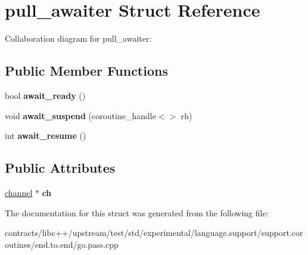 \hypertarget{structpull__awaiter}{}\section{pull\+\_\+awaiter Struct Reference}
\label{structpull__awaiter}


Collaboration diagram for pull\+\_\+awaiter\+:
\subsection*{Public Member Functions}
\begin{DoxyCompactItemize}
\item 
\mbox{\label{structpull__awaiter_aa73c9e70d6ba80627bf626d3929cedc0}} 
bool {\bfseries await\+\_\+ready} ()
\item 
\mbox{\label{structpull__awaiter_ab6231749220f85fc957e53d109980dd3}} 
void {\bfseries await\+\_\+suspend} (coroutine\+\_\+handle$<$$>$ rh)
\item 
\mbox{\label{structpull__awaiter_ab16abc8ffb1d202f09ddc0ecee459ae1}} 
int {\bfseries await\+\_\+resume} ()
\end{DoxyCompactItemize}
\subsection*{Public Attributes}
\begin{DoxyCompactItemize}
\item 
\mbox{\label{structpull__awaiter_a7c0c696ce6653ddc42bb9fb76ed9df8b}} 
\mbox{\hyperlink{classchannel}{channel}} $\ast$ {\bfseries ch}
\end{DoxyCompactItemize}


The documentation for this struct was generated from the following file\+:\begin{DoxyCompactItemize}
\item 
contracts/libc++/upstream/test/std/experimental/language.\+support/support.\+coroutines/end.\+to.\+end/go.\+pass.\+cpp\end{DoxyCompactItemize}
